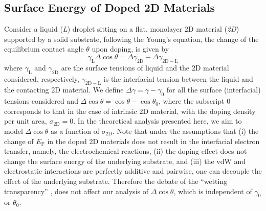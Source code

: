 \subsection{Surface Energy of Doped 2D Materials}
\label{sec:org8df08f3}

Consider a liquid (\emph{L}) droplet sitting on a flat, monolayer 2D
material (\emph{2D}) supported by a solid substrate, following the Young’s
equation, the change of the equilibrium contact angle \(\theta\) upon
doping, is given by
\begin{equation}
\label{eqn-def-Young-Delta-theta}
\gamma_{\mathrm{L}} \Delta \cos\theta = \Delta \gamma_{\mathrm{2D}}
                                 - \Delta \gamma_{\mathrm{2D-L}}
\end{equation}
where \(\gamma_{\mathrm{L}}\) and \(\gamma_{\mathrm{2D}}\) are the surface
tensions of liquid and the 2D material considered, respectively,
\(\gamma_{\mathrm{2D-L}}\) is the interfacial tension between the liquid
and the contacting 2D material. We define \(\Delta \gamma = \gamma -
\gamma_{0}\) for all the surface (interfacial) tensions considered and
\(\Delta \cos \theta = \cos \theta - \cos \theta_{0}\), where the
subscript 0 corresponds to that in the case of intrinsic 2D material,
with the doping density per unit area, \(\sigma_{\mathrm{2D}} = 0\). In
the theoretical analysis presented here, we aim to model \(\Delta \cos
\theta\) as a function of \(\sigma_{\mathrm{2D}}\). Note that under the
assumptions that (i) the change of \(E_{\mathrm{F}}\) in the doped 2D
materials does not result in the interfacial electron transfer,
namely, the electrochemical reactions, (ii) the doping effect does not
change the surface energy of the underlying substrate, and (iii) the
vdW and electrostatic interactions are perfectly additive and
pairwise, one can decouple the effect of the underlying
substrate. Therefore the debate of the “wetting transparency”
\cite{rafiee_wetting_2012,shih_wetting_2013}, does not affect our
analysis of \(\Delta \cos \theta\), which is independent of \(\gamma_{0}\)
or \(\theta_{0}\).

